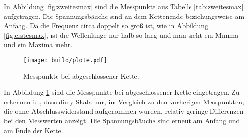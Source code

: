  In Abbildung \ref{fig:zweitesmax} sind die Messpunkte
aus Tabelle \ref{tab:zweitesmax} aufgetragen. Die Spannungsbäuche sind an dem
Kettenende beziehungsweise am Anfang. Da die Frequenz circa doppelt so groß ist,
wie in Abbildung \ref{fig:erstesmax}, ist die Wellenlänge nur halb so lang und
man sieht ein Minima und ein Maxima mehr.

\begin{figure}[h]
  \centering
  \texttt{[image: build/plote.pdf]}
  \caption{Messpunkte bei abgeschlossener Kette.}
  \label{fig:absw=wellw}
\end{figure}

In Abbildung \ref{fig:absw=wellw} sind die Messpunkte bei abgeschlossener Kette
eingetragen. Zu erkennen ist, dass die y-Skala nur, im Vergleich zu den vorherigen
Messpunkten, die ohne Abschlusswiderstand aufgenommen wurden, relativ geringe Differenzen bei
den Messwerten anzeigt. Die Spannungsbäuche sind erneut am Anfang und am Ende der Kette.
